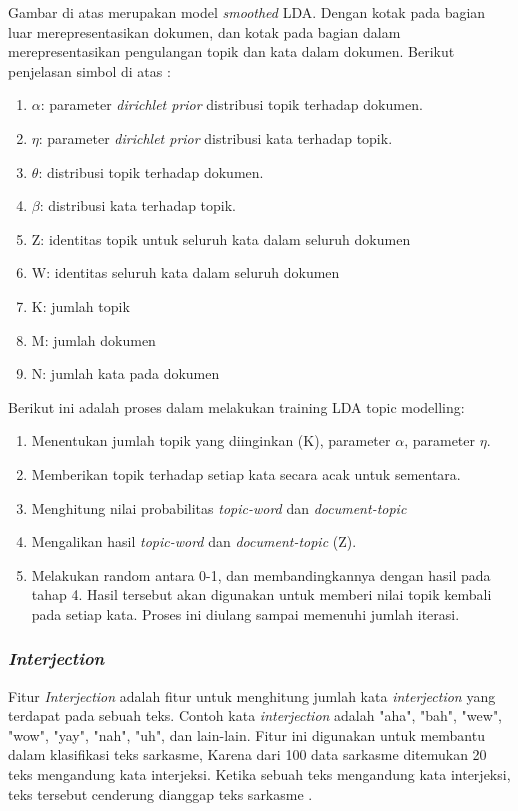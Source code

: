 Gambar di atas merupakan model\textit{ smoothed} LDA. Dengan kotak 
pada bagian luar merepresentasikan dokumen, dan kotak pada bagian dalam 
merepresentasikan pengulangan topik dan kata dalam dokumen. Berikut 
penjelasan simbol di atas \label{14}:
\begin{enumerate}[leftmargin=*]
	\item $ \alpha $: parameter \textit{dirichlet prior }distribusi topik terhadap dokumen.
	\item $ \eta $: parameter \textit{dirichlet prior }distribusi kata terhadap topik.
	\item $ \theta $: distribusi topik terhadap dokumen.
	\item $\beta$: distribusi kata terhadap topik.
	\item Z: identitas topik untuk seluruh kata dalam seluruh dokumen
	\item W: identitas seluruh kata dalam seluruh dokumen
	\item K: jumlah topik
	\item M: jumlah dokumen
	\item N: jumlah kata pada dokumen
\end{enumerate}
Berikut ini adalah proses dalam melakukan training LDA topic modelling:
\begin{enumerate}[leftmargin=*]
	\item Menentukan jumlah topik yang diinginkan (K), parameter $ \alpha $, parameter $ \eta $.
	\item Memberikan topik terhadap setiap kata secara acak untuk sementara.
	\item Menghitung nilai probabilitas \textit{topic-word }dan \textit{document-topic}
	\item Mengalikan hasil\textit{ topic-word }dan \textit{document-topic }(Z).
	\item Melakukan random antara 0-1, dan membandingkannya dengan hasil pada tahap 4. Hasil tersebut akan digunakan untuk memberi nilai topik kembali pada setiap kata. Proses ini diulang sampai memenuhi jumlah iterasi.
\end{enumerate}

\subsubsection{\textit{Interjection}}
Fitur \textit{Interjection }adalah fitur untuk menghitung jumlah kata 
\textit{interjection }yang terdapat pada sebuah teks. Contoh kata 
\textit{interjection} adalah "aha", "bah", "wew", "wow", 
"yay", "nah", "uh", dan lain-lain. Fitur ini digunakan untuk 
membantu dalam klasifikasi teks sarkasme, Karena dari 100 data sarkasme 
ditemukan 20 teks mengandung kata interjeksi. Ketika sebuah teks 
mengandung kata interjeksi, teks tersebut cenderung dianggap teks 
sarkasme \cite{5}.
